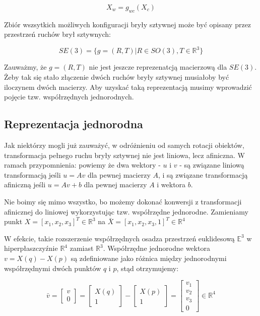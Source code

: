 \documentclass[a4paper,12pt]{article}
\newcommand{\E}{\mathbb{E}}
\newcommand{\RR}{\mathbb{R}^3}
\newcommand{\RRq}{\mathbb{R}^4}
\begin{document}
\begin{equation}
X_w = g_{wc}(X_c)
\end{equation}

Zbiór wszsytkich możliwych konfiguracji bryły sztywnej może być opisany przez przestrzeń ruchów brył sztywnych:

\begin{equation}
SE(3) = \{ g = (R,T) | R \in SO(3), T \in \RR \}
\end{equation}

Zauważmy, że $g = (R,T)$ nie jest jeszcze reprezenatcją macierzową dla $SE(3)$. Żeby tak się stało złączenie dwóch ruchów bryły sztywnej musiałoby być iloczynem dwóch macierzy. Aby uzyskać taką reprezentacją musimy wprowadzić pojęcie tzw. współrzędnych jednorodnych.



\subsection{Reprezentacja jednorodna}


\indent \indent Jak niektórzy mogli już zauważyć, w odróżnieniu od samych rotacji obiektów, transformacja pełnego ruchu bryły sztywnej nie jest liniowa, lecz afiniczna. W ramach przypomnienia: powiemy że dwa wektory - $u$ i $v$ - są związane liniową transformacją jeśli $u = Av$ dla pewnej macierzy $A$, i są związane transformacją afiniczną jeśli $u = Av + b$ dla pewnej macierzy $A$ i wektora $b$.

Nie boimy się mimo wszystko, bo możemy dokonać konwersji z transformacji afinicznej do liniowej wykorzystując tzw. współrzędne jednorodne. Zamieniamy punkt $X = [x_1,x_2,x_3]^T \in \RR$ na $\bar{X} = [x_1,x_2,x_3,1]^T \in \RRq$

W efekcie, takie rozszerzenie współrzędnych osadza przestrzeń euklidesową $\E^3$ w hiperpłaszczyźnie $\RRq$ zamiast $\RR$. Współrzędne jednorodne wektora $v = X(q) - X(p)$ są zdefiniowane jako różnica między jednorodnymi współrzędnymi dwóch punktów $q$ i $p$, stąd otrzymujemy:


\begin{equation}
\bar{v} = \begin{bmatrix} v \\ 0 \end{bmatrix} = \begin{bmatrix} X(q) \\ 1 \end{bmatrix} - \begin{bmatrix} X(p) \\ 1 \end{bmatrix} = \begin{bmatrix} v_1 \\ v_2 \\ v_3 \\ 0 \end{bmatrix} \in \RRq
\end{equation}
\end{document}
